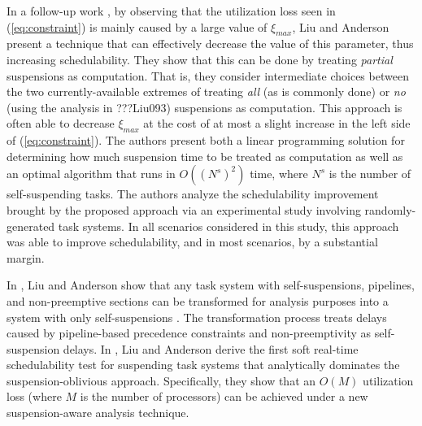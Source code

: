 In a follow-up work \cite{Liu5}, by observing that the utilization loss seen in (\ref{eq:constraint}) is mainly caused by a large value of $\xi_{max}$, Liu and Anderson present a technique that can effectively decrease the value of this parameter, thus increasing schedulability. They show that this can be done by treating \textit{partial} suspensions as computation. That is, they consider intermediate choices between the two currently-available extremes of treating \textit{all} (as is commonly done) or \textit{no} (using the analysis in ???Liu093) suspensions as computation. This approach is often able to decrease $\xi_{max}$ at the cost of at most a slight increase in the left side of (\ref{eq:constraint}). The authors present both a linear programming solution for determining how much suspension time to be treated as computation as well as an optimal algorithm that runs in $O((N^s)^2)$ time, where $N^s$ is the number of self-suspending tasks. The authors analyze the schedulability improvement brought by the proposed approach via an experimental study involving randomly-generated task systems. In all scenarios considered in this study, this approach was able to improve schedulability, and in most scenarios, by a substantial margin. 

In \cite{Liu4}, Liu and Anderson  show that any task system with self-suspensions, pipelines, and
non-preemptive sections can be transformed for analysis purposes into a system with only self-suspensions \cite{Liu4}. The transformation process treats delays caused by pipeline-based precedence constraints and non-preemptivity as self-suspension delays.
In \cite{Liu9,Liu11}, Liu and Anderson derive the first soft real-time schedulability test for suspending task systems that analytically dominates the suspension-oblivious approach. Specifically, they show that an $O(M)$ utilization loss (where $M$ is the number of processors) can be achieved under a new suspension-aware analysis technique. 





  